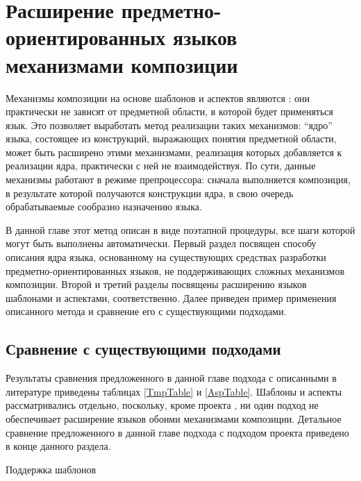 \part{Расширение предметно-ориентированных языков механизмами композиции}\label{part4}

Механизмы композиции на основе шаблонов и аспектов являются : они практически не зависят от предметной области, в которой будет применяться язык. Это позволяет выработать метод реализации таких механизмов: ``ядро'' языка, состоящее из конструкций, выражающих понятия предметной области, может быть расширено этими механизмами, реализация которых добавляется к реализации ядра, практически с ней не взаимодействуя. По сути, данные механизмы работают в режиме препроцессора: сначала выполняется композиция, в результате которой получаются конструкции ядра, в свою очередь обрабатываемые сообразно назначению языка.

В данной главе этот метод описан в виде поэтапной процедуры, все шаги которой могут быть выполнены автоматически. Первый раздел посвящен способу описания ядра языка, основанному на существующих средствах разработки предметно-ориентированных языков, не поддерживающих сложных механизмов композиции. Второй и третий разделы посвящены расширению языков шаблонами и аспектами, соответственно. Далее приведен пример применения описанного метода и сравнение его с существующими подходами.






\chapter{Сравнение с существующими подходами}

Результаты сравнения предложенного в данной главе подхода с описанными в литературе приведены таблицах \ref{TmpTable} и \ref{AspTable}. Шаблоны и аспекты рассматривались отдельно, поскольку, кроме проекта , ни один подход не обеспечивает расширение языков обоими механизмами композиции. Детальное сравнение предложенного в данной главе подхода с подходом проекта  приведено в конце данного раздела.

\begin{table}[htb]
	\centering
\newcommand{\dissonly}[1]{#1}

	\caption{Поддержка шаблонов}\label{TmpTable}
\end{table}

